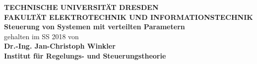 

\pagestyle{empty}

\begin{center}
	\Large \textbf{TECHNISCHE UNIVERSITÄT DRESDEN \\ \vspace{1.5cm} FAKULTÄT ELEKTROTECHNIK UND INFORMATIONSTECHNIK\\ \vspace{4cm}
 {\Huge Steuerung von Systemen mit verteilten Parametern}}\\
	\vspace{4cm}
	gehalten im SS 2018 von\\ \vspace{1cm}
	 \textbf{Dr.-Ing. Jan-Christoph Winkler
	 \\
 Institut für Regelungs- und Steuerungstheorie}\\
\vspace{2cm}

\end{center}
\newpage